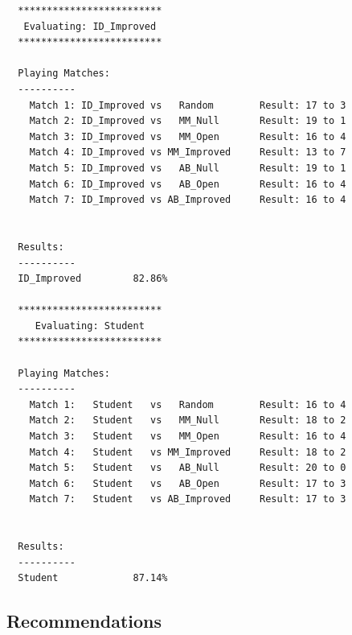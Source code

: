 \documentclass{article}
\begin{document}
\begin{verbatim}
  *************************
   Evaluating: ID_Improved
  *************************

  Playing Matches:
  ----------
    Match 1: ID_Improved vs   Random    	Result: 17 to 3
    Match 2: ID_Improved vs   MM_Null   	Result: 19 to 1
    Match 3: ID_Improved vs   MM_Open   	Result: 16 to 4
    Match 4: ID_Improved vs MM_Improved 	Result: 13 to 7
    Match 5: ID_Improved vs   AB_Null   	Result: 19 to 1
    Match 6: ID_Improved vs   AB_Open   	Result: 16 to 4
    Match 7: ID_Improved vs AB_Improved 	Result: 16 to 4


  Results:
  ----------
  ID_Improved         82.86%

  *************************
     Evaluating: Student
  *************************

  Playing Matches:
  ----------
    Match 1:   Student   vs   Random    	Result: 16 to 4
    Match 2:   Student   vs   MM_Null   	Result: 18 to 2
    Match 3:   Student   vs   MM_Open   	Result: 16 to 4
    Match 4:   Student   vs MM_Improved 	Result: 18 to 2
    Match 5:   Student   vs   AB_Null   	Result: 20 to 0
    Match 6:   Student   vs   AB_Open   	Result: 17 to 3
    Match 7:   Student   vs AB_Improved 	Result: 17 to 3


  Results:
  ----------
  Student             87.14%
\end{verbatim}

\subsection{Recommendations}
\end{document}
